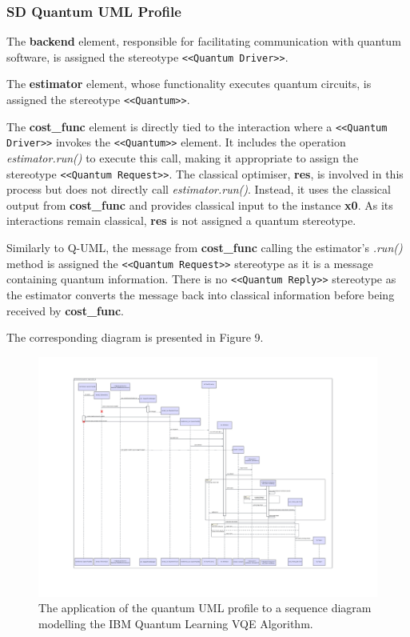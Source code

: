 \documentclass{article}
\begin{document}
\subsubsection{SD Quantum UML Profile}

The \textbf{backend} element, responsible for facilitating communication with quantum software, is assigned the stereotype \texttt{<<Quantum Driver>>}.

The \textbf{estimator} element, whose functionality executes quantum circuits, is assigned the stereotype \texttt{<<Quantum>>}.

The \textbf{cost\_func} element is directly tied to the interaction where a \texttt{<<Quantum Driver>>} invokes the \texttt{<<Quantum>>} element. It includes the operation \textit{estimator.run()} to execute this call, making it appropriate to assign the stereotype \texttt{<<Quantum Request>>}. The classical optimiser, \textbf{res}, is involved in this process but does not directly call \textit{estimator.run()}. Instead, it uses the classical output from \textbf{cost\_func} and provides classical input to the instance \textbf{x0}. As its interactions remain classical, \textbf{res} is not assigned a quantum stereotype.

Similarly to Q-UML, the message from \textbf{cost\_func} calling the estimator's \textit{.run()} method is assigned the \texttt{<<Quantum Request>>} stereotype as it is a message containing quantum information. There is no \texttt{<<Quantum Reply>>} stereotype as the estimator converts the message back into classical information before being received by \textbf{cost\_func}.

The corresponding diagram is presented in Figure 9.

\begin{figure}
    \centering
    \includegraphics[width=1\linewidth]{VQE UML Profile SD Final Version.pdf}
    \caption{The application of the quantum UML profile to a sequence diagram modelling the IBM Quantum Learning VQE Algorithm.}
    \label{fig:QUMLP_SD}
\end{figure}
\end{document}
